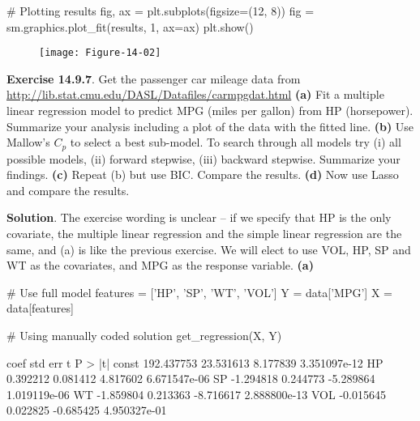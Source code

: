 \begin{python}
# Plotting results
fig, ax = plt.subplots(figsize=(12, 8))
fig = sm.graphics.plot_fit(results, 1, ax=ax)
plt.show()
\end{python}

\begin{figure}[H]
\centering
\texttt{[image: Figure-14-02]}
\end{figure}


\textbf{Exercise 14.9.7}. Get the passenger car mileage data from
\url{http://lib.stat.cmu.edu/DASL/Datafiles/carmpgdat.html}
\textbf{(a)} Fit a multiple linear regression model to predict MPG
(miles per gallon) from HP (horsepower). Summarize your analysis
including a plot of the data with the fitted line.
\textbf{(b)} Use Mallow's \(C_p\) to select a best sub-model. To search
through all models try (i) all possible models, (ii) forward stepwise,
(iii) backward stepwise. Summarize your findings.
\textbf{(c)} Repeat (b) but use BIC. Compare the results.
\textbf{(d)} Now use Lasso and compare the results.

\textbf{Solution}.
The exercise wording is unclear -- if we specify that HP is the only
covariate, the multiple linear regression and the simple linear
regression are the same, and (a) is like the previous exercise.
We will elect to use VOL, HP, SP and WT as the covariates, and MPG as
the response variable.
\textbf{(a)}

\begin{python}
# Use full model
features = ['HP', 'SP', 'WT', 'VOL']
Y = data['MPG']
X = data[features]
\end{python}

\begin{python}
# Using manually coded solution
get_regression(X, Y)
\end{python}
\begin{console}
             coef    std err         t       P > |t|
const  192.437753  23.531613  8.177839  3.351097e-12
HP       0.392212   0.081412  4.817602  6.671547e-06
SP      -1.294818   0.244773 -5.289864  1.019119e-06
WT      -1.859804   0.213363 -8.716617  2.888800e-13
VOL     -0.015645   0.022825 -0.685425  4.950327e-01
\end{console}
        

